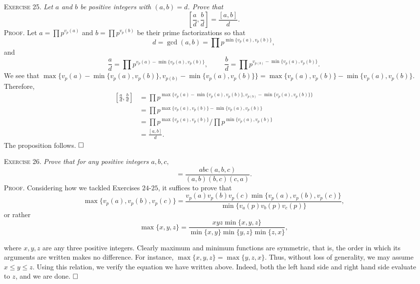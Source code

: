 \documentclass[11pt, leqno]{article}
\newcommand{\done}{\ensuremath{\hfill\square}}
\begin{document}
\textsc{Exercise 25}. \emph{Let $a$ and $b$ be positive integers with $(a,b) = d$. Prove that 
\begin{displaymath}
\left[ \frac{a}{d}, \frac{b}{d} \right] = \frac{[a,b]}{d}.
\end{displaymath}}\textsc{Proof}. Let $a = \prod p^{v_p(a)}$ and $b = \prod p^{v_p(b)}$ be their prime factorizations so that 
\begin{displaymath}
d = \gcd(a, b) = \prod p^{\min\{v_p(a), v_p(b)\}},
\end{displaymath}
and
\begin{displaymath}
\frac{a}{d} = \prod p^{v_p(a) - \min\{v_p(a), v_p(b)\}}, \hspace{1cm} \frac{b}{d} = \prod p^{v_{p(b)} - \min\{v_p(a), v_p(b)\}}.
\end{displaymath}
We see that $\max\{ v_p(a) -\min\{v_p(a), v_p(b)\}, v_{p(b)} - \min\{v_p(a), v_p(b)\} \} = \max\{ v_p(a), v_p(b) \} - \min\{v_p(a), v_p(b)\}$. Therefore, 
\begin{align*}
  \left[ \frac{a}{d}, \frac{b}{d} \right] &= \prod p^{\max\{ v_p(a) -\min\{v_p(a), v_p(b)\}, v_{p(b)} - \min\{v_p(a), v_p(b)\} \}} \\
                                          &= \prod p^{\max\{ v_p(a), v_p(b) \} - \min\{v_p(a), v_p(b)\}} \\
  &= \prod p^{\max\{ v_p(a), v_p(b) \}} / \prod p^{\min\{v_p(a), v_p(b)\}} \\
  &= \frac{[a,b]}{d}.
\end{align*}
The proposition follows. \done

\textsc{Exercise 26}. \emph{Prove that for any positive integers $a, b, c,$ 
\begin{displaymath}
[a, b, c] = \frac{abc(a,b,c)}{(a,b)(b,c)(c,a)}.
\end{displaymath}}\textsc{Proof}. Considering how we tackled Exercises $24$-$25$, it suffices to prove that
\begin{displaymath}
\max\{ v_p(a), v_p(b), v_p(c) \} = \frac{v_p(a)v_p(b)v_p(c)  \min\{ v_p(a), v_p(b), v_p(c) \}}{\min\{ v_a(p) v_b(p) v_c(p)  \}},
\end{displaymath}
or rather 
\begin{displaymath}
\max\{x, y, z\} = \frac{xyz \min\{ x, y, z \}}{ \min\{ x, y \} \min\{ y, z \}\min\{ z, x \}},
\end{displaymath}

where $x,y,z$ are any three positive integers. Clearly maximum and minimum functions are symmetric, that is, the order in which its arguments are written makes no difference. For instance, $\max\{ x,y,z \} = \max\{ y,z,x \}$. Thus, without loss of generality, we may assume $x \leq y \leq z$. Using this relation, we verify the equation we have written above. Indeed, both the left hand side and right hand side evaluate to $z$, and we are done. \done
\end{document}
